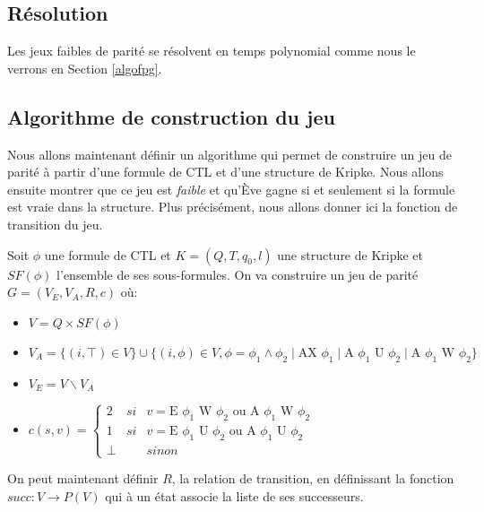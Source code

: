 \documentclass[10pt,a4paper]{article}
\begin{document}
\subsection{Résolution}
Les jeux faibles de parité se résolvent en temps polynomial comme nous le verrons en Section \ref{algofpg}.

\subsection{Algorithme de construction du jeu}
Nous allons maintenant définir un algorithme qui permet de construire un jeu de parité à partir d'une formule de CTL et d'une structure de Kripke. Nous allons ensuite montrer que ce jeu est \emph{faible} et qu'Ève gagne si et seulement si la formule est vraie dans la structure. Plus précisément, nous allons donner ici la fonction de transition du jeu.

Soit $\phi$ une formule de CTL et $K = (Q,T,q_0,l)$  une structure de Kripke et $SF(\phi)$ l'ensemble de ses sous-formules.
On va construire un jeu de parité $G = (V_E,V_A,R,c)$ où:
\begin{itemize}
	\item $V = Q \times SF(\phi)$
	\item $V_A = \{(i, \top ) \in V\} \cup \{(i, \phi) \in V, \phi = \phi_1 \land \phi_2 \mid \mbox{AX } \phi_1\mid \mbox{A } \phi_1 \mbox{ U } \phi_2 \mid \mbox{A } \phi_1 \mbox{ W } \phi_2\}$
	\item $V_E = V \backslash V_A$
	\item $c(s,v) = \left \{
	\begin{array}{rcl}
		2 & si & v = \mbox{E } \phi_1 \mbox{ W } \phi_2\text{ ou }\mbox{A } \phi_1 \mbox{ W } \phi_2\\
		1 & si & v = \mbox{E } \phi_1 \mbox{ U } \phi_2\text{ ou }\mbox{A } \phi_1 \mbox{ U } \phi_2\\
		\bot && sinon
	\end{array}
	\right .$
\end{itemize}

\bigskip

On peut maintenant définir $R$, la relation de transition, en définissant la fonction $succ : V \to P(V)$ qui à un état associe la liste de ses successeurs.\\
\end{document}
